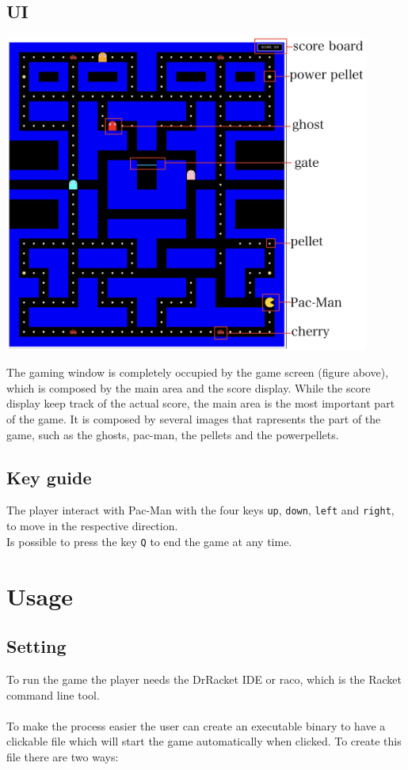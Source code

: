 \documentclass{article}
\begin{document}
  \subsection{UI}
\begin{center}
\includegraphics[width=12cm]{./images/user_interface.png}
\end{center}
The gaming window is completely occupied by the game screen (figure above), which is composed by the main area and the score display. While the score display keep track of the actual score, the main area is the most important part of the game. It is composed by several images that rapresents the part of the game, such as the ghosts, pac-man, the pellets and the powerpellets.
 
\subsection{Key guide}
The player interact with Pac-Man with the four keys \texttt{up}, \texttt{down}, \texttt{left} and \texttt{right}, to move in the respective direction.
\\
Is possible to press the key \texttt{Q} to end the game at any time.

 
  \section{Usage}
  
  \subsection{Setting}
To run the game the player needs the DrRacket IDE or raco, which is the Racket command line tool.\\
\\
To make the process easier the user can create an executable binary to have a clickable file which will start the game automatically when clicked. To create this file there are two ways:
\end{document}
